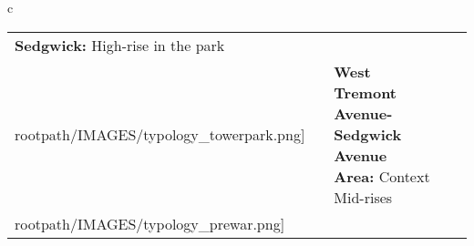 \begin{table}[H]
        \begin{tabular}{c}
        \begin{tabular}{m{1.25in} m{2in} m{.1in} m{1.25in} m{2in}}
\textbf{Sedgwick:} {High-rise in the park} & \texttt{[image: \\rootpath/IMAGES/typology\_towerpark.png]} & & \textbf{West Tremont Avenue-Sedgwick Avenue Area:} {Context Mid-rises} & \texttt{[image: \\rootpath/IMAGES/typology\_prewar.png]}
\end{tabular}\end{tabular}
        \end{table}